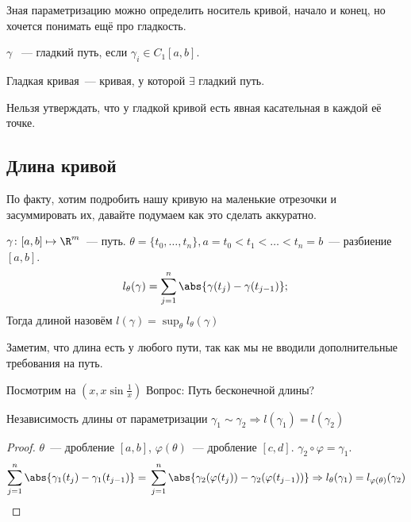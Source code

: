 \begin{remark}
    Зная параметризацию можно определить носитель кривой,
    начало и конец, но хочется понимать ещё про гладкость.
\end{remark}
\begin{definition}
    $\gamma$ ~--- гладкий путь, если $\gamma_i\in C_1[a,b]$.\\
\end{definition}
\begin{definition}
    Гладкая кривая~--- кривая, у которой $\exists$ гладкий путь.
\end{definition}
\begin{remark}
    Нельзя утверждать, что у гладкой кривой есть явная касательная
    в каждой её точке.
\end{remark}
\subsection{Длина кривой}
По факту, хотим подробить нашу кривую на маленькие отрезочки
и засуммировать их, давайте подумаем как это сделать аккуратно.\\
\quad
\begin{definition}
    $\gamma\colon [a, b]\mapsto \R^m$~--- путь.
    $\theta = \{t_0,\dots, t_n\}, a = t_0 < t_1 < \dots < t_n = b$~---
    разбиение $[a, b]$.
    \[
        l_\theta(\gamma) = \sum\limits_{j = 1}^{n} \abs{\gamma(t_j) - \gamma(t_{j - 1})};\\
    \]
    Тогда длиной назовём  $l(\gamma) = \sup_\theta l_\theta(\gamma)$
\end{definition}
\begin{remark}
    Заметим, что длина есть у любого пути, так как мы не вводили
    дополнительные требования на путь.
\end{remark}
\begin{remark}
    Посмотрим на $(x, x\sin \frac{1}{x})$
    Вопрос: Путь бесконечной длины?
\end{remark}
\begin{namedtheorem}{Независимость длины от параметризации}
    $\gamma_1 \sim \gamma_2\Rightarrow l(\gamma_1) = l(\gamma_2)$
\end{namedtheorem}
\begin{proof}
    $\theta$~--- дробление $[a,b]$,
    $\varphi(\theta)$~--- дробление $[c,d]$.
    $\gamma_2\circ\varphi=\gamma_1$.
    \[
        \sum\limits_{j = 1}^{n}\abs{\gamma_1(t_j) - \gamma_1(t_{j-1})}=\\
        \sum\limits_{j=1}^{n}\abs{\gamma_2(\varphi(t_j))-\gamma_2(\varphi(t_{j-1}))}
        \Rightarrow
        l_{\theta}(\gamma_1) = l_{\varphi(\theta)}(\gamma_2)
    \]
\end{proof}
